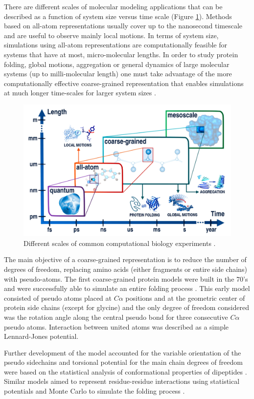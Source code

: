 \documentclass[
	12pt,				%
	openright,			%
	twoside,			%
	a4paper,			%
	english,			%
	french,				%
	spanish,			%
	brazil,				%
	]{abntex2}
\begin{document}
There are different scales of  molecular modeling applications that can be described as a function of system size versus time scale (Figure \ref{fig:scale}). Methods based on all-atom representations usually cover up to the nanosecond timescale and are useful to observe mainly local motions. In terms of system size, simulations using all-atom representations are computationally feasible for systems that have at most, micro-molecular lengths. In order to study protein folding, global motions, aggregation or general dynamics of large molecular systems (up to milli-molecular length) one must take advantage of the more computationally effective coarse-grained representation that enables simulations at much longer time-scales for larger system sizes \cite{Kmiecik2016}.

\begin{figure}
	\centering
	\includegraphics[width=0.7\linewidth]{figures/scale}
	\caption{Different scales of common computational biology experiments \cite{Kmiecik2016}.}
	\label{fig:scale}
\end{figure}

The main objective of a coarse-grained representation is to reduce the number of degrees of freedom, replacing amino acids (either fragments or entire side chains) with pseudo-atoms. The first coarse-grained protein models were built in the 70's and were successfully able to simulate an entire folding process \cite{Levitt1975}. This early model consisted of pseudo atoms placed at $C\alpha$ positions and at the geometric center of protein side chains (except for glycine) and the only degree of freedom considered was the rotation angle along the central pseudo bond for three consecutive $C\alpha$ pseudo atoms. Interaction between united atoms was described as a simple Lennard-Jones potential.

Further development of the model accounted for the variable orientation of the pseudo sidechains and torsional potential for the main chain degrees of freedom were based on the statistical analysis of conformational properties of dipeptides \cite{Levitt1976}. Similar models aimed to represent residue-residue interactions using statistical potentials and Monte Carlo to simulate the folding process \cite{Wilson1989}.
\end{document}
